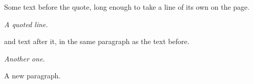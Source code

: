 \documentclass{article}
\renewenvironment{quote}{\begin{center}\itshape}{\end{center}}
\begin{document}
Some text before the quote, long enough to take a line of its own on the page.
\begin{quote}
A quoted line.
\end{quote}
and text after it, in the same paragraph as the text before.

\begin{quote}
Another one.
\end{quote}

A new paragraph.
\end{document}
